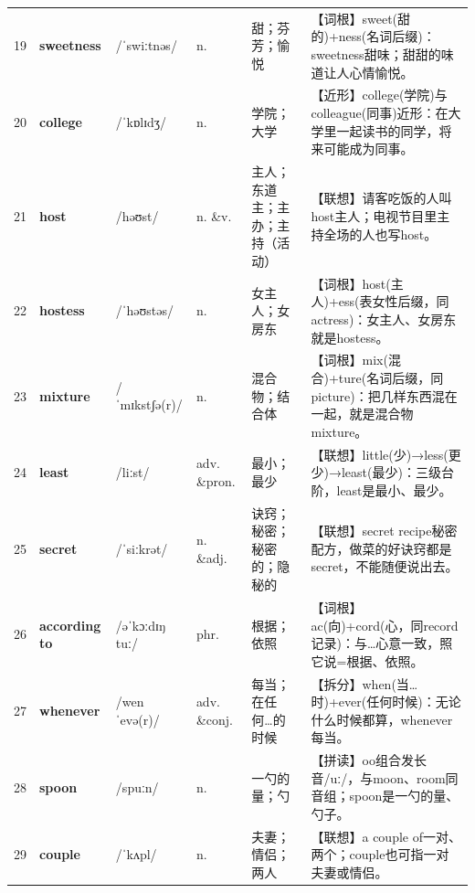 \documentclass[UTF8,a4paper,11pt,oneside]{ctexbook}
\newcommand{\cellword}[1]{{\bfseries\textcolor{wordcol}{#1}}}
\newcommand{\cellipa}[1]{{\footnotesize\textcolor{ipacol}{#1}}}
\newcommand{\cellpos}[1]{\textcolor{poscol}{#1}}
\newcommand{\cellno}[1]{\textcolor{volcolor!75!black}{#1}}
\begin{document}
{\begin{longtable}{@{}C{0.045\textwidth}L{0.155\textwidth}L{0.175\textwidth}C{0.070\textwidth}L{0.180\textwidth}L{0.282\textwidth}@{}}
 \cellno{19} & \cellword{sweetness} & \cellipa{/ˈswiːtnəs/} & \cellpos{n.} & 甜；芬芳；愉悦 & \textcolor{tagRoot}{【词根】}sweet(甜的)+ness(名词后缀)：sweetness甜味；甜甜的味道让人心情愉悦。 \\
\cellno{20} & \cellword{college} & \cellipa{/ˈkɒlɪdʒ/} & \cellpos{n.} & 学院；大学 & \textcolor{tagNear}{【近形】}college(学院)与colleague(同事)近形：在大学里一起读书的同学，将来可能成为同事。 \\
 \cellno{21} & \cellword{host} & \cellipa{/həʊst/} & \cellpos{n. \&v.} & 主人；东道主；主办；主持（活动） & \textcolor{tagAssoc}{【联想】}请客吃饭的人叫host主人；电视节目里主持全场的人也写host。 \\
\cellno{22} & \cellword{hostess} & \cellipa{/ˈhəʊstəs/} & \cellpos{n.} & 女主人；女房东 & \textcolor{tagRoot}{【词根】}host(主人)+ess(表女性后缀，同actress)：女主人、女房东就是hostess。 \\
 \cellno{23} & \cellword{mixture} & \cellipa{/ˈmɪkstʃə(r)/} & \cellpos{n.} & 混合物；结合体 & \textcolor{tagRoot}{【词根】}mix(混合)+ture(名词后缀，同picture)：把几样东西混在一起，就是混合物mixture。 \\
\cellno{24} & \cellword{least} & \cellipa{/liːst/} & \cellpos{adv. \&pron.} & 最小；最少 & \textcolor{tagAssoc}{【联想】}little(少)→\allowbreak{}less(更少)→\allowbreak{}least(最少)：三级台阶，least是最小、最少。 \\
 \cellno{25} & \cellword{secret} & \cellipa{/ˈsiːkrət/} & \cellpos{n. \&adj.} & 诀窍；秘密；秘密的；隐秘的 & \textcolor{tagAssoc}{【联想】}secret recipe秘密配方，做菜的好诀窍都是secret，不能随便说出去。 \\
\cellno{26} & \cellword{according to} & \cellipa{/əˈkɔːdɪŋ tuː/} & \cellpos{phr.} & 根据；依照 & \textcolor{tagRoot}{【词根】}ac(向)+cord(心，同record记录)：与…心意一致，照它说=根据、依照。 \\
 \cellno{27} & \cellword{whenever} & \cellipa{/wenˈevə(r)/} & \cellpos{adv. \&conj.} & 每当；在任何…的时候 & \textcolor{tagSplit}{【拆分】}when(当…时)+ever(任何时候)：无论什么时候都算，whenever每当。 \\
\cellno{28} & \cellword{spoon} & \cellipa{/spuːn/} & \cellpos{n.} & 一勺的量；勺 & \textcolor{tagSpell}{【拼读】}oo组合发长音/uː/，与moon、room同音组；spoon是一勺的量、勺子。 \\
 \cellno{29} & \cellword{couple} & \cellipa{/ˈkʌpl/} & \cellpos{n.} & 夫妻；情侣；两人 & \textcolor{tagAssoc}{【联想】}a couple of一对、两个；couple也可指一对夫妻或情侣。 \\

\end{longtable}}
\end{document}
